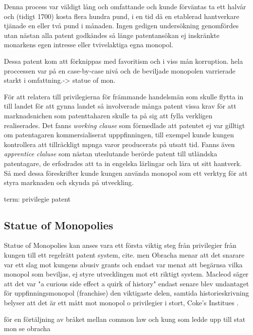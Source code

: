 Denna process var väldigt lång och omfattande och kunde
förväntas ta ett halvår och (tidigt 1700) kosta flera hundra pund, i en tid då en etablerad hantverkare tjänade en eller två pund i månaden. \cite{macleod}
Ingen gedigen undersökning genomfördes utan nästan alla patent godkändes så
länge patentansökan ej inskränkte monarkens egen intresse eller tvivelaktiga egna monopol. 

Dessa patent kom att förknippas med favoritism och i viss mån korruption. hela proccessen var på en
case-by-case nivå och de beviljade monopolen varrierade starkt i omfattning.-> statue of mon.

För att relatera till privilegierna för främmande handelsmän som skulle flytta in till landet för att
gynna landet så involverade många patent vissa krav för att marknadsnichen som patenttaharen skulle ta på
sig att fylla verkligen realiserades. Det fanns \emph{working clause} som förmedlade att patentet ej var
gilltigt om patentagaren kommersialiserat upppfinningen, till exempel kunde kungen kontrollera att
tillräckligt mpnga varor producerats på utsatt tid. Fanns även \emph{apprentice claluse} som nästan
uteslutande berörde patent till utländska patentagare, de erfodrades att ta in engelska lärlingar och
lära ut sitt hantverk. Så med dessa föreskrifter kunde kungen använda monopol som ett verktyg för att styra marknaden och skynda på utveckling.\cite{bracha}

term: privilegie patent


\subsection{Statue of Monopolies} %
\label{sub:statue_of_monopolies}

Statue of Monopolies kan anses vara ett första viktig steg från privilegier från kungen till ett
regelrätt patent system, cite. men Obracha menar att det snarare var ett slag mot kungens abusiv grants
och endast var menat att begärnsa vilka monopol som beviljas, ej styre utvecklingen mot ett riktigt
system. Macleod \cite{macleod2} säger att det var "a curious side effect a quirk of history" endast
senare blev undantaget för uppfinningsmonopol (franchise) den viktigaste delen, samtida historieskrivning
belyser att det är ett mått mot monopol o privilegier i stort, Coke's Institues \cite{coke}.

för en förtäljning av bråket mellan common law och kung som ledde upp till stat mon se obracha

